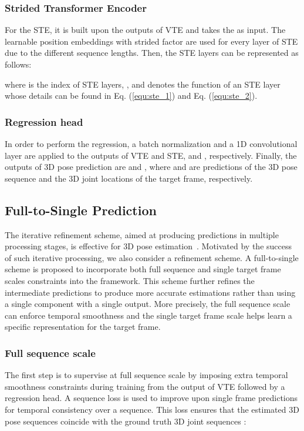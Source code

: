 \documentclass[journal]{IEEEtran}
\begin{document}
\subsubsection{Strided Transformer Encoder}
For the STE, it is built upon the outputs of VTE and takes the  as input. 
The learnable position embeddings  with strided factor  are used for every layer of STE due to the different sequence lengths. 
Then, the STE layers can be represented as follows:

where  is the index of STE layers, , and  denotes the function of an STE layer whose details can be found in Eq. (\ref{equ:ste_1}) and Eq. (\ref{equ:ste_2}). 

\subsubsection{Regression head}
In order to perform the regression, a batch normalization and a 1D convolutional layer are applied to the outputs of VTE and STE,  and , respectively. 
Finally, the outputs of 3D pose prediction are  and , where  and  are predictions of the 3D pose sequence and the 3D joint locations of the target frame, respectively. 

\subsection{Full-to-Single Prediction}
The iterative refinement scheme, aimed at producing predictions in multiple processing stages, is effective for 3D pose estimation~\cite{pavlakos2017coarse,cai2019exploiting}. 
Motivated by the success of such iterative processing, we also consider a refinement scheme. 
A full-to-single scheme is proposed to incorporate both full sequence and single target frame scales constraints into the framework. 
This scheme further refines the intermediate predictions to produce more accurate estimations rather than using a single component with a single output. 
More precisely, the full sequence scale can enforce temporal smoothness and the single target frame scale helps learn a specific representation for the target frame. 

\subsubsection{Full sequence scale}
The first step is to supervise at full sequence scale by imposing extra temporal smoothness constraints during training from the output of VTE followed by a regression head. 
A sequence loss  is used to improve upon single frame predictions for temporal consistency over a sequence. 
This loss ensures that the estimated 3D pose sequences  coincide with the ground truth 3D joint sequences : 
\end{document}
